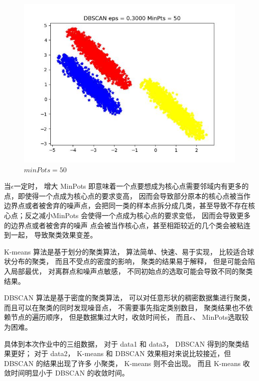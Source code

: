 \documentclass[UTF8]{ctexart}
\begin{document}
\begin{figure}[H]
\begin{minipage}{0.32\linewidth}
		\includegraphics[width=0.9\linewidth]{data3-50.jpg}
		\caption{$minPots=50$}
		\label{chutian2}%
	\end{minipage}
\end{figure}

当$\epsilon$一定时， 增大 MinPots 即意味着一个点要想成为核心点需要邻域内有更多的点，即使得一个点成为核心点的要求变高， 因而会导致部分原本的核心点被当作边界点或者被舍弃的噪声点，会把同一类的样本点拆分成几类，甚至导致不存在核心点；反之减小MinPots 会使得一个点成为核心点的要求变低， 因而会导致更多的边界点或者被舍弃的噪声
点会被当作核心点，甚至相距较近的几个类会被粘连到一起， 导致聚类效果变差。\\


\noindent \textbf{}

K-means 算法是基于划分的聚类算法， 算法简单、快速、易于实现， 比较适合球状分布的聚类， 而且不受点的密度的影响， 聚类的结果易于解释， 但是可能会陷入局部最优， 对离群点和噪声点敏感， 不同初始点的选取可能会导致不同的聚类结果。

DBSCAN 算法是基于密度的聚类算法， 可以对任意形状的稠密数据集进行聚类， 而且可以在聚类的同时发现噪音点， 不需要事先指定类别数目， 聚类结果也不依赖节点的遍历顺序， 但是数据集过大时，收敛时间长， 而且$\epsilon$、 MinPots选取较为困难。

具体到本次作业中的三组数据， 对于 data1 和 data3， DBSCAN 得到的聚类结果更好；
对于 data2， K-means 和 DBSCAN 效果相对来说比较接近，但 DBSCAN 的结果出现了许多
小聚类， K-means 则不会出现。 而且 K-means 收敛时间明显小于 DBSCAN 的收敛时间。
\end{document}
